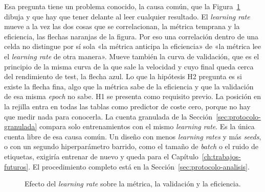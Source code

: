 Esa pregunta tiene un problema conocido, la causa común, que la Figura~\ref{fig:causa-comun} dibuja y que hay que tener delante al leer cualquier resultado. El \emph{learning rate} mueve a la vez las dos cosas que se correlacionan, la métrica temprana y la eficiencia, las flechas naranjas de la figura. Por eso una correlación dentro de una celda no distingue por sí sola «la métrica anticipa la eficiencia» de «la métrica lee el \emph{learning rate} de otra manera». Mueve también la curva de validación, que es el principio de la misma curva de la que sale la velocidad y cuyo final queda cerca del rendimiento de test, la flecha azul. Lo que la hipótesis H2 pregunta es si existe la flecha fina, algo que la métrica sabe de la eficiencia y que la validación de esa misma \emph{epoch} no sabe. H1 se presenta como requisito previo. La posición en la rejilla entra en todas las tablas como predictor de coste cero, porque no hay que medir nada para conocerla. La cuenta granulada de la Sección~\ref{sec:protocolo-granulada} compara solo entrenamientos con el mismo \emph{learning rate}. Es la única cuenta libre de esa causa común. Un diseño con menos \emph{learning rates} y más \emph{seeds}, o con un segundo hiperparámetro barrido, como el tamaño de \emph{batch} o el ruido de etiquetas, exigiría entrenar de nuevo y queda para el Capítulo~\ref{ch:trabajos-futuros}. El procedimiento completo está en la Sección~\ref{sec:protocolo-analisis}.

\begin{figure}[htbp]
\centering
{}
\caption{Efecto del \emph{learning rate} sobre la métrica, la validación y la eficiencia.}
\label{fig:causa-comun}
\end{figure}

